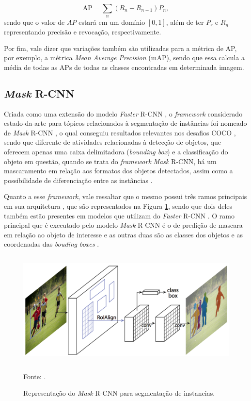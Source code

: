 \begin{equation}
    \label{instance:eq:1}
    \text{AP} = \sum_n (R_n - R_{n-1}) P_n,
\end{equation}
sendo que o valor de $AP$ estará em um domínio $[0,1]$, além de ter $P_r$ e $R_n$ representando precisão e revocação, respectivamente.

Por fim, vale dizer que variações também são utilizadas para a métrica de AP, por exemplo, a métrica \textit{Mean Average Precision} (mAP), sendo que essa calcula a média de todas as APs de todas as classes encontradas em determinada imagem.


\subsection{\textit{Mask} R-CNN}
\label{instance:mask}

Criada como uma extensão do modelo \textit{Faster} R-CNN \cite{Ren2017}, o \textit{framework} considerado estado-da-arte para tópicos relacionados à segmentação de instâncias foi nomeado de \textit{Mask} R-CNN \cite{He2020}, o qual conseguiu resultados relevantes nos desafios COCO \cite{Lin2016}, sendo que diferente de atividades relacionadas à detecção de objetos, que oferecem apenas uma caixa delimitadora (\textit{bounding box}) e a classificação do objeto em questão, quando se trata do \textit{framework} \textit{Mask} R-CNN, há um mascaramento em relação aos formatos dos objetos detectados, assim como a possibilidade de diferenciação entre as instâncias \cite{Hafiz2020}.

Quanto a esse \textit{framework}, vale ressaltar que o mesmo possui três ramos principais em sua arquitetura \cite{He2020, Minaee2021}, que são representados na Figura \ref{instance:fig:2}, sendo que dois deles também estão presentes em modelos que utilizam do \textit{Faster} R-CNN \cite{Ren2017}. O ramo principal que é executado pelo modelo \textit{Mask} R-CNN é o de predição de mascara em relação ao objeto de interesse e as outras duas são as classes dos objetos e as coordenadas das \textit{bouding boxes} \cite{Minaee2021}.

\begin{figure}[H]
    \centering
    \caption{Representação do \textit{Mask} R-CNN para segmentação de instancias.}
    \includegraphics[height=2.3in]{recursos/imagens/instance/Mask-R-CNN_examp.png}
    \label{instance:fig:2}

    \vspace*{1 cm}
    Fonte: \cite{He2020}.
\end{figure}

